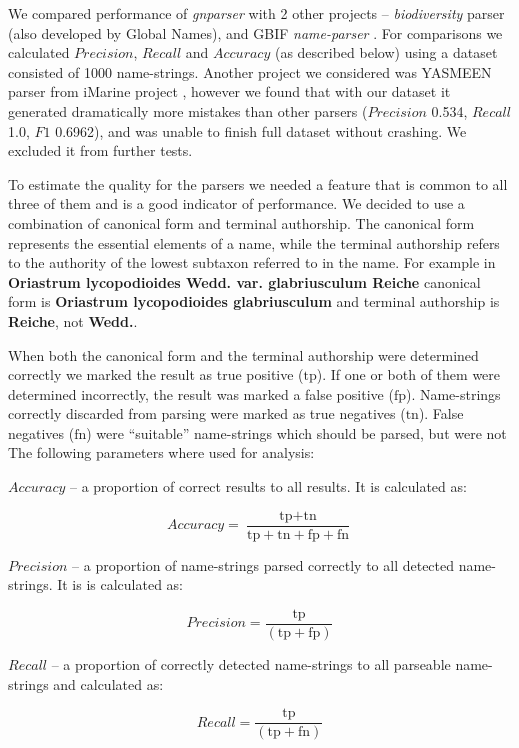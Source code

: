\documentclass{bmcart}
\begin{document}
We compared performance of \textit{gnparser} with 2 other projects --
\textit{biodiversity} parser \cite{Boyle2013, biodiversity} (also developed by
Global Names), and GBIF \textit{name-parser} \cite{gbifNameParser}. For
comparisons we calculated $Precision$, $Recall$ and $Accuracy$ (as described
below) using a dataset consisted of 1000 name-strings. Another project we
considered was YASMEEN parser from iMarine project \cite{VandenBerghe2015},
however we found that with our dataset it generated dramatically more mistakes
than other parsers ($Precision$ 0.534, $Recall$ 1.0, $F1$ 0.6962), and was
unable to finish full dataset without crashing. We excluded it from further
tests.

To estimate the quality for the parsers we needed a feature that is common to
all three of them and is a good indicator of performance.  We decided to use a
combination of canonical form and terminal authorship.  The canonical form
represents the essential elements of a name, while the terminal authorship
refers to the authority of the lowest subtaxon  referred to in the name. For
example in \textbf{Oriastrum lycopodioides Wedd.  var.  glabriusculum Reiche}
canonical form is \textbf{Oriastrum lycopodioides glabriusculum} and terminal
authorship is \textbf{Reiche}, not \textbf{Wedd.}.

When both the canonical form and the terminal authorship were determined
correctly we marked the result as true positive ($\text{tp}$).  If one or both
of them were determined incorrectly, the result was marked a false positive
($\text{fp}$). Name-strings correctly discarded from parsing were marked as
true negatives ($\text{tn}$). False negatives ($\text{fn}$) were ``suitable''
name-strings which should be parsed, but were not The
following parameters where used for analysis:

$Accuracy$ -- a proportion of correct results to all results.  It is calculated
as:

\[Accuracy = \dfrac{\text{tp} + \text{tn}} {\text{tp} + \text{tn} + \text{fp} +
    \text{fn}}\]

$Precision$ -- a proportion of name-strings parsed correctly to all detected
name-strings. It is is calculated as:

\[Precision = \dfrac{\text{tp}}{(\text{tp} + \text{fp})}\]

$Recall$ -- a proportion of correctly detected name-strings to all parseable
name-strings and calculated as:

\[Recall = \dfrac{\text{tp}}{(\text{tp} + \text{fn})}\]
\end{document}
